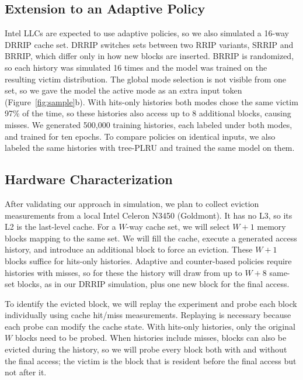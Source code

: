\subsection{Extension to an Adaptive Policy}

Intel LLCs are expected to use adaptive policies, so we
also simulated a 16-way DRRIP cache set. DRRIP switches
sets between two RRIP variants, SRRIP and BRRIP, which
differ only in how new blocks are inserted. BRRIP is
randomized, so each history was simulated 16 times and the
model was trained on the resulting victim distribution.
The global mode selection is not visible from one set, so
we gave the model the active mode as an extra input token
(Figure~\ref{fig:sample}b).
With hits-only histories both modes chose the same victim
97\% of the time, so these histories also access up to 8
additional blocks, causing misses. We generated 500,000
training histories, each labeled under both modes, and
trained for ten epochs. To compare policies on identical
inputs, we also labeled the same histories with tree-PLRU
and trained the same model on them.

\subsection{Hardware Characterization}

After validating our approach in simulation, we plan to
collect eviction measurements from a local Intel Celeron
N3450 (Goldmont). It has no L3, so its L2 is the
last-level cache.
For a $W$-way cache set, we will select $W+1$ memory blocks
mapping to the same set. We will fill the cache, execute
a generated access history, and introduce an additional
block to force an eviction. These $W+1$ blocks suffice for
hits-only histories. Adaptive and counter-based policies
require histories with misses, so for these the history
will draw from up to $W+8$ same-set blocks, as in our DRRIP
simulation, plus one new block for the final access.

To identify the evicted block, we will replay the experiment
and probe each block individually using cache hit/miss
measurements. Replaying is necessary because each probe can
modify the cache state. With hits-only histories, only the
original $W$ blocks need to be probed. When histories include
misses, blocks can also be evicted during the history, so we
will probe every block both with and without the final
access; the victim is the block that is resident before the
final access but not after it.

